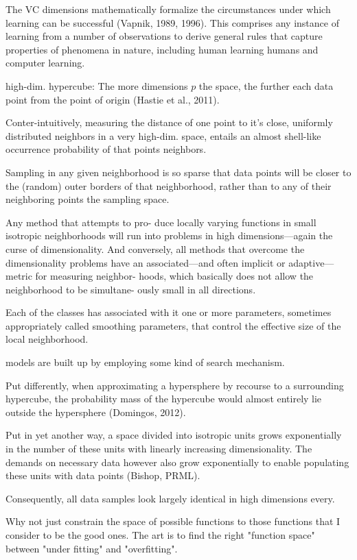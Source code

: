 \documentclass[authoryear,review,3p]{elsarticle}
\begin{document}
The VC dimensions mathematically formalize the circumstances under which learning can be successful (Vapnik, 1989, 1996). This comprises any instance of learning from a number of observations to derive general rules that capture properties of phenomena in nature, including human learning humans and computer learning. 


high-dim. hypercube: 
The more dimensions $p$ the space,
the further each data point from the point of origin
(Hastie et al., 2011).

Conter-intuitively,
measuring the distance of one point to it's close,
uniformly distributed neighbors
in a very high-dim. space,
entails an almost shell-like occurrence probability of
that points neighbors.

Sampling in any given neighborhood is so sparse that
data points will be closer to the (random) outer borders of that neighborhood,
rather than to any of their neighboring points the sampling space.


Any method that attempts to pro- duce locally varying functions in small isotropic neighborhoods will run into problems in high dimensions—again the curse of dimensionality. And conversely, all methods that overcome the dimensionality problems have an associated—and often implicit or adaptive—metric for measuring neighbor- hoods, which basically does not allow the neighborhood to be simultane- ously small in all directions.

Each of the classes has associated with it one or more parameters, sometimes appropriately called smoothing parameters, that control the effective size of the local neighborhood.

models are built up by employing some kind of search mechanism.


Put differently,
when approximating a hypersphere by recourse to a surrounding hypercube,
the probability mass of the hypercube
would almost entirely lie outside the hypersphere
(Domingos, 2012).

Put in yet another way,
a space divided into isotropic units grows exponentially in the
number of these units with linearly increasing dimensionality.
The demands on necessary data however also grow exponentially to
enable populating these units with data points
(Bishop, PRML).



Consequently, all data samples look largely identical
in high dimensions every.

Why not just constrain the space of possible functions to those functions that I consider to be the good ones. The art is to find the right "function space" between "under fitting" and "overfitting".
\end{document}
